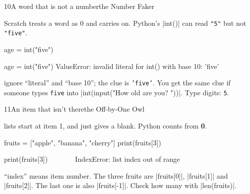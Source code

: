 \begin{bzcard}{10}{A word that is not a number}{the Number Faker}
\noindent\begin{minipage}[c]{0.43\linewidth}
 Scratch treats a word as 0 and carries on. Python's \py|int()| can read \texttt{"5"} but not \texttt{"five"}.
\end{minipage}\hfill
\begin{minipage}[c]{0.54\linewidth}
\begin{bzsnip}
age = int("five")
\end{bzsnip}
\end{minipage}\par
\begin{bzerror}
    age = int("five")
ValueError: invalid literal for int() with base 10: 'five'
\end{bzerror}
 ignore ``literal'' and ``base 10''; the clue is \texttt{'five'}. You get the same clue if someone types \texttt{five} into \py|int(input("How old are you? "))|. Type digits: \texttt{5}.
\end{bzcard}

\begin{bzcard}{11}{An item that isn't there}{the Off-by-One Owl}
\noindent\begin{minipage}[c]{0.43\linewidth}
 lists start at item 1, and  just gives a blank. Python counts from \textbf{0}.
\end{minipage}\hfill
\begin{minipage}[c]{0.54\linewidth}
\begin{bzsnip}
fruits = ["apple", "banana", "cherry"]
print(fruits[3])
\end{bzsnip}
\end{minipage}\par
\begin{bzerror}
    print(fruits[3])
          ~~~~~~^^^
IndexError: list index out of range
\end{bzerror}
 ``index'' means item number. The three fruits are \py|fruits[0]|, \py|fruits[1]| and \py|fruits[2]|. The last one is also \py|fruits[-1]|. Check how many with \py|len(fruits)|.
\end{bzcard}

